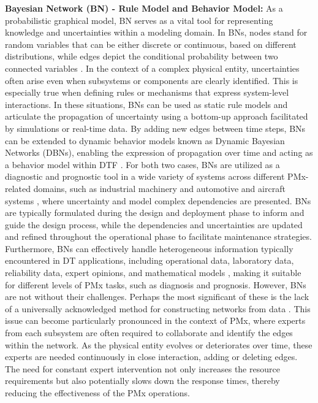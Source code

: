 \documentclass[runningheads]{llncs}
\begin{document}
\textbf{Bayesian Network (BN) - Rule Model and Behavior Model:} As a probabilistic graphical model, BN serves as a vital tool for representing knowledge and uncertainties within a modeling domain. In BNs, nodes stand for random variables that can be either discrete or continuous, based on different distributions, while edges depict the conditional probability between two connected variables \cite{yu2021digital}. In the context of a complex physical entity, uncertainties often arise even when subsystems or components are clearly identified. This is especially true when defining rules or mechanisms that express system-level interactions. In these situations, BNs can be used as static rule models and articulate the propagation of uncertainty using a bottom-up approach facilitated by simulations or real-time data. By adding new edges between time steps, BNs can be extended to dynamic behavior models known as Dynamic Bayesian Networks (DBNs), enabling the expression of propagation over time and acting as a behavior model within DTF \cite{wang2022structural}. For both two cases, BNs are utilized as a diagnostic and prognostic tool in a wide variety of systems across different PMx-related domains, such as industrial machinery \cite{yu2021digital} and automotive and aircraft systems \cite{li2017dynamic}, where uncertainty and model complex dependencies are presented. BNs are typically formulated during the design and deployment phase to inform and guide the design process, while the dependencies and uncertainties are updated and refined throughout the operational phase to facilitate maintenance strategies. Furthermore, BNs can effectively handle heterogeneous information typically encountered in DT applications, including operational data, laboratory data, reliability data, expert opinions, and mathematical models \cite{bartram2014integration}, making it suitable for different levels of PMx tasks, such as diagnosis and prognosis. However, BNs are not without their challenges. Perhaps the most significant of these is the lack of a universally acknowledged method for constructing networks from data \cite{li2017dynamic}. This issue can become particularly pronounced in the context of PMx, where experts from each subsystem are often required to collaborate and identify the edges within the network. As the physical entity evolves or deteriorates over time, these experts are needed continuously in close interaction, adding or deleting edges. The need for constant expert intervention not only increases the resource requirements but also potentially slows down the response times, thereby reducing the effectiveness of the PMx operations.\\
\end{document}
